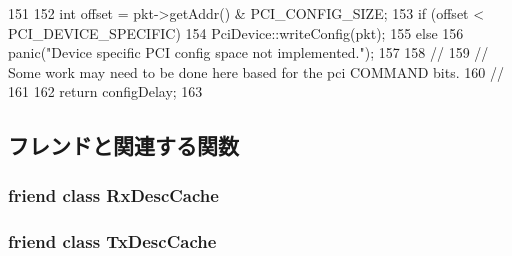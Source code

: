 \begin{DoxyCode}
151 {
152     int offset = pkt->getAddr() & PCI_CONFIG_SIZE;
153     if (offset < PCI_DEVICE_SPECIFIC)
154         PciDevice::writeConfig(pkt);
155     else
156         panic("Device specific PCI config space not implemented.\n");
157 
158     //
159     // Some work may need to be done here based for the pci COMMAND bits.
160     //
161 
162     return configDelay;
163 }
\end{DoxyCode}


\subsection{フレンドと関連する関数}
\hypertarget{classIGbE_a5117ecf4d368d174c17a9304676a45a5}{
\subsubsection[{RxDescCache}]{\setlength{\rightskip}{0pt plus 5cm}friend class {\bf RxDescCache}}}
\label{classIGbE_a5117ecf4d368d174c17a9304676a45a5}
\hypertarget{classIGbE_ab83c1d837daa8ccbbd651c133208ced0}{
\subsubsection[{TxDescCache}]{\setlength{\rightskip}{0pt plus 5cm}friend class {\bf TxDescCache}}}
\label{classIGbE_ab83c1d837daa8ccbbd651c133208ced0}


